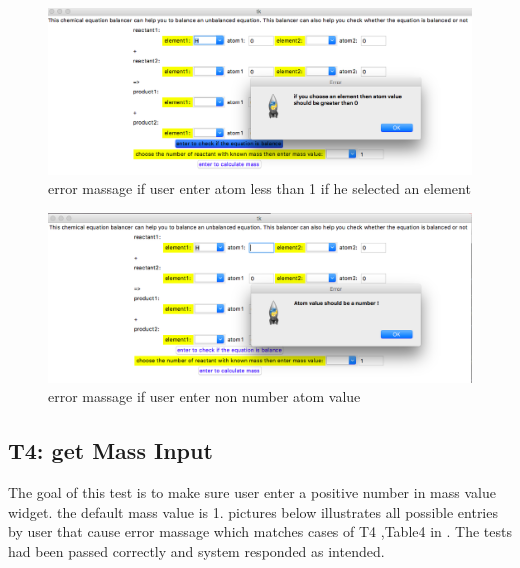 \documentclass[12pt, titlepage]{article}
\begin{document}
\begin{figure}[h!]
 \begin{center}
 \includegraphics [width=\textwidth]{atomnegative}
 \caption{\label{ Figure 7:} error massage if user enter atom less than 1 if he selected an element}
 \end{center}
 \end{figure}
 
 \begin{figure}[h!]
 \begin{center}
 \includegraphics [width=\textwidth]{atomnotnumber}
 \caption{\label{ Figure 8:} error massage if user enter non number atom value}
 \end{center}
 \end{figure}
 
 
\subsection{T4: get Mass Input}

The goal of this test is to make sure user enter a positive number in mass value widget. the default mass value is 1. pictures below illustrates all possible entries by user that cause error massage which matches cases of T4 ,Table4 in \cite{UnitVnVPlan}. The tests had been passed correctly and system responded as intended. 
\end{document}

